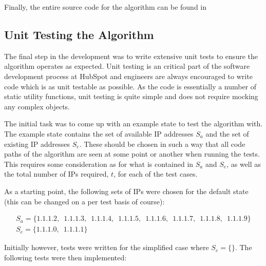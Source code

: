 Finally, the entire source code for the algorithm can be found in 

\break

\subsection{Unit Testing the Algorithm}
The final step in the development was to write extensive unit tests to ensure the algorithm operates as expected. Unit testing is an critical part of the software development process at HubSpot and engineers are always encouraged to write code which is as unit testable as possible. As the code is essentially a number of static utility functions, unit testing is quite simple and does not require mocking any complex objects.  

The initial task was to come up with an example state to test the algorithm with. The example state contains the set of available IP addresses $S_a$ and the set of existing IP addresses $S_e$. These should be chosen in such a way that all code paths of the algorithm are seen at some point or another when running the tests. This requires some consideration as for what is contained in $S_a$ and $S_e$, as well as the total number of IPs required, $t$, for each of the test cases.

As a starting point, the following sets of IPs were chosen for the default state (this can be changed on a per test basis of course):

\begin{equation}\label{eq:initialState}
\begin{gathered}
S_a = \{1.1.1.2,\enspace1.1.1.3,\enspace1.1.1.4,\enspace1.1.1.5,\enspace1.1.1.6,\enspace1.1.1.7,\enspace1.1.1.8,\enspace1.1.1.9\} \\
S_e = \{1.1.1.0,\enspace1.1.1.1\}
\end{gathered}
\end{equation}

Initially however, tests were written for the simplified case where $S_e = \{\}$. The following tests were then implemented:

